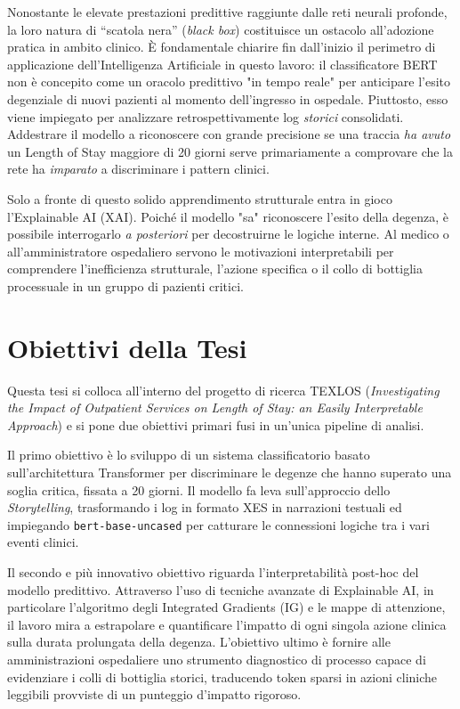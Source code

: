Nonostante le elevate prestazioni predittive raggiunte dalle reti neurali profonde, la loro natura di ``scatola nera'' (\textit{black box}) costituisce un ostacolo all'adozione pratica in ambito clinico. È fondamentale chiarire fin dall'inizio il perimetro di applicazione dell'Intelligenza Artificiale in questo lavoro: il classificatore BERT non è concepito come un oracolo predittivo "in tempo reale" per anticipare l'esito degenziale di nuovi pazienti al momento dell'ingresso in ospedale. Piuttosto, esso viene impiegato per analizzare retrospettivamente log \textit{storici} consolidati. Addestrare il modello a riconoscere con grande precisione se una traccia \textit{ha avuto} un Length of Stay maggiore di 20 giorni serve primariamente a comprovare che la rete ha \textit{imparato} a discriminare i pattern clinici. 

Solo a fronte di questo solido apprendimento strutturale entra in gioco l'Explainable AI (XAI). Poiché il modello "sa" riconoscere l'esito della degenza, è possibile interrogarlo \textit{a posteriori} per decostruirne le logiche interne. Al medico o all'amministratore ospedaliero servono le motivazioni interpretabili per comprendere l'inefficienza strutturale, l'azione specifica o il collo di bottiglia processuale in un gruppo di pazienti critici.

\section{Obiettivi della Tesi}
Questa tesi si colloca all'interno del progetto di ricerca TEXLOS \cite{texlos2026} (\textit{Investigating the Impact of Outpatient Services on Length of Stay: an Easily Interpretable Approach}) e si pone due obiettivi primari fusi in un'unica pipeline di analisi.

Il primo obiettivo è lo sviluppo di un sistema classificatorio basato sull'architettura Transformer per discriminare le degenze che hanno superato una soglia critica, fissata a 20 giorni. Il modello fa leva sull'approccio dello \textit{Storytelling}, trasformando i log in formato XES in narrazioni testuali ed impiegando \texttt{bert-base-uncased} per catturare le connessioni logiche tra i vari eventi clinici.

Il secondo e più innovativo obiettivo riguarda l'interpretabilità post-hoc del modello predittivo. Attraverso l'uso di tecniche avanzate di Explainable AI, in particolare l'algoritmo degli Integrated Gradients (IG) e le mappe di attenzione, il lavoro mira a estrapolare e quantificare l'impatto di ogni singola azione clinica sulla durata prolungata della degenza. L'obiettivo ultimo è fornire alle amministrazioni ospedaliere uno strumento diagnostico di processo capace di evidenziare i colli di bottiglia storici, traducendo token sparsi in azioni cliniche leggibili provviste di un punteggio d'impatto rigoroso.

